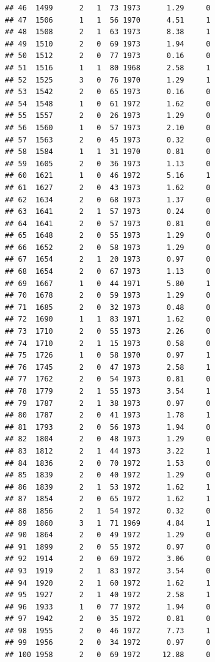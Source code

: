 \documentclass[
]{book}
\begin{document}
\begin{verbatim}
## 46  1499      2   1  73 1973      1.29     0
## 47  1506      1   1  56 1970      4.51     1
## 48  1508      2   1  63 1973      8.38     1
## 49  1510      2   0  69 1973      1.94     0
## 50  1512      2   0  77 1973      0.16     0
## 51  1516      1   1  80 1968      2.58     1
## 52  1525      3   0  76 1970      1.29     1
## 53  1542      2   0  65 1973      0.16     0
## 54  1548      1   0  61 1972      1.62     0
## 55  1557      2   0  26 1973      1.29     0
## 56  1560      1   0  57 1973      2.10     0
## 57  1563      2   0  45 1973      0.32     0
## 58  1584      1   1  31 1970      0.81     0
## 59  1605      2   0  36 1973      1.13     0
## 60  1621      1   0  46 1972      5.16     1
## 61  1627      2   0  43 1973      1.62     0
## 62  1634      2   0  68 1973      1.37     0
## 63  1641      2   1  57 1973      0.24     0
## 64  1641      2   0  57 1973      0.81     0
## 65  1648      2   0  55 1973      1.29     0
## 66  1652      2   0  58 1973      1.29     0
## 67  1654      2   1  20 1973      0.97     0
## 68  1654      2   0  67 1973      1.13     0
## 69  1667      1   0  44 1971      5.80     1
## 70  1678      2   0  59 1973      1.29     0
## 71  1685      2   0  32 1973      0.48     0
## 72  1690      1   1  83 1971      1.62     0
## 73  1710      2   0  55 1973      2.26     0
## 74  1710      2   1  15 1973      0.58     0
## 75  1726      1   0  58 1970      0.97     1
## 76  1745      2   0  47 1973      2.58     1
## 77  1762      2   0  54 1973      0.81     0
## 78  1779      2   1  55 1973      3.54     1
## 79  1787      2   1  38 1973      0.97     0
## 80  1787      2   0  41 1973      1.78     1
## 81  1793      2   0  56 1973      1.94     0
## 82  1804      2   0  48 1973      1.29     0
## 83  1812      2   1  44 1973      3.22     1
## 84  1836      2   0  70 1972      1.53     0
## 85  1839      2   0  40 1972      1.29     0
## 86  1839      2   1  53 1972      1.62     1
## 87  1854      2   0  65 1972      1.62     1
## 88  1856      2   1  54 1972      0.32     0
## 89  1860      3   1  71 1969      4.84     1
## 90  1864      2   0  49 1972      1.29     0
## 91  1899      2   0  55 1972      0.97     0
## 92  1914      2   0  69 1972      3.06     0
## 93  1919      2   1  83 1972      3.54     0
## 94  1920      2   1  60 1972      1.62     1
## 95  1927      2   1  40 1972      2.58     1
## 96  1933      1   0  77 1972      1.94     0
## 97  1942      2   0  35 1972      0.81     0
## 98  1955      2   0  46 1972      7.73     1
## 99  1956      2   0  34 1972      0.97     0
## 100 1958      2   0  69 1972     12.88     0

\end{verbatim}
\end{document}
